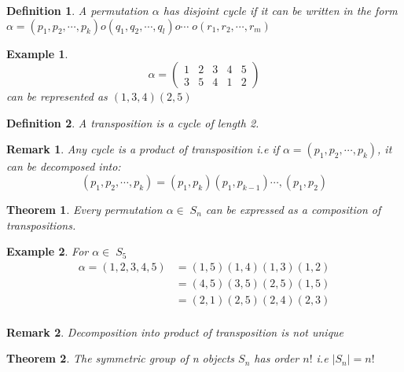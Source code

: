 \documentclass[a4paper, 12pt, openany]{report}
\newtheorem{rmk}{Remark}[section]
\newtheorem{thm}{Theorem}[section]
\newtheorem{defn}{Definition}[section]
\newtheorem{ex}{Example}[section]
\begin{document}
	\begin{defn} A permutation $\alpha$ has disjoint cycle if it can be written in the form $\alpha=(p_1,p_2,\cdots,p_k)o(q_1,q_2,\cdots,q_l) o\cdots\;o(r_1,r_2,\cdots,r_m)$\end{defn}
	\begin{ex}$$\alpha=\begin{pmatrix}1&2&3&4&5\\3&5&4&1&2\end{pmatrix}$$ can be represented as $(1,3,4)(2,5)$\end{ex}
\begin{defn}A transposition is a cycle of length 2.\end{defn}
	\begin{rmk}Any cycle is a product of transposition i.e if $\alpha=(p_1,p_2,\cdots,p_k)$, it can be decomposed into:$$(p_1,p_2,\cdots,p_k)=(p_1,p_k)(p_1,p_{k-1})\cdots,(p_1,p_2)$$\end{rmk}
	\begin{thm}Every permutation $\alpha\in\;S_n$ can be expressed as a composition of transpositions.\end{thm}
	\begin{ex}\label{1.6.3} For $\alpha\in\;S_5$ \begin{align*}\alpha=(1,2,3,4,5)&=(1,5)(1,4)(1,3)(1,2)\\&=(4,5)(3,5)(2,5)(1,5)\\&=(2,1)(2,5)(2,4)(2,3)\\
		\end{align*}\end{ex}
	\begin{rmk} Decomposition into product of transposition is not unique\end{rmk}
\begin{thm}
	The symmetric group of n objects $S_n$ has order $n!$ i.e \break $|S_n|=n!$
\end{thm}
\end{document}
